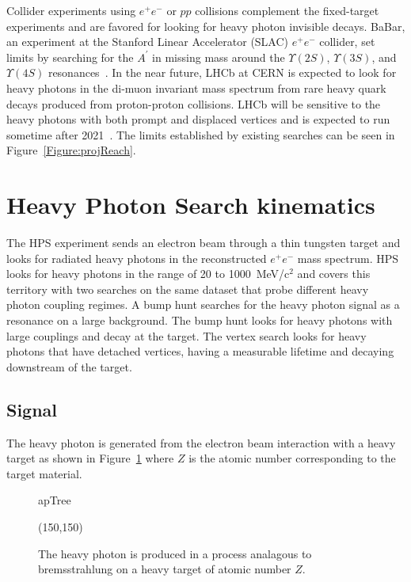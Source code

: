 \indent Collider experiments using $e^+e^-$ or $pp$ collisions complement the fixed-target experiments and are favored for looking for heavy photon invisible decays.  BaBar, an experiment at the Stanford Linear Accelerator (SLAC) $e^+e^-$ collider, set limits by searching for the $A^{\prime}$ in missing mass around the $\Upsilon(2S)$, $\Upsilon(3S)$, and $\Upsilon(4S)$ resonances~\cite{Lees_2014xha}. In the near future, LHCb at CERN is expected to look for heavy photons in the di-muon invariant mass spectrum from rare heavy quark decays produced from proton-proton collisions. LHCb will be sensitive to the heavy photons with both prompt and displaced vertices and is expected to run sometime after 2021~\cite{Ilten_2016tkc}. The limits established by existing searches can be seen in Figure~\ref{Figure:projReach}.

\section{Heavy Photon Search kinematics}
The HPS experiment sends an electron beam through a thin tungsten target and looks for radiated heavy photons in the reconstructed $e^+e^-$ mass spectrum. HPS looks for heavy photons in the range of 20 to 1000~MeV/c$^2$ and covers this territory with two searches on the same dataset that probe different heavy photon coupling regimes. A bump hunt searches for the heavy photon signal as a resonance on a large background. The bump hunt looks for heavy photons with large couplings and decay at the target. The vertex search looks for heavy photons that have detached vertices, having a measurable lifetime and decaying downstream of the target. 

\subsection{Signal}

The heavy photon is generated from the electron beam interaction with a heavy target as shown in Figure~\ref{fig:apTree} where $Z$ is the atomic number corresponding to the target material.  

\begin{figure}[htb]
    \begin{center}
	\begin{fmffile}{apTree}
	\begin{fmfgraph*}(150,150)
	\fmfstraight
		\fmffreeze
		\fmffreeze	
	\end{fmfgraph*}
	\end{fmffile}
  	\end{center}
    	\caption[Heavy photon production in a fixed-target experiment]{The heavy photon is produced in a process analagous to bremsstrahlung on a heavy target of atomic number $Z$.}
   	 \label{fig:apTree}	
\end{figure}

